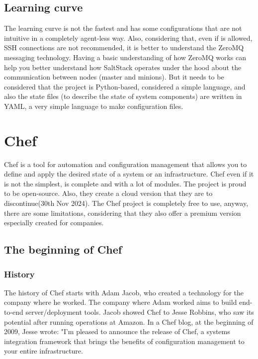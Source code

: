 \documentclass[12pt,a4paper,openright,twoside]{book}
\begin{document}
\section{Learning curve}
The learning curve is not the fastest and has some configurations that are not intuitive in a completely agent-less way.
Also, considering that, even if is allowed, SSH connections are not recommended, it is better to understand the ZeroMQ messaging technology.
Having a basic understanding of how ZeroMQ works can help you better understand how SaltStack operates under the hood about the communication between nodes (master and minions).
But it needs to be considered that the project is Python-based, considered a simple language, and also the state files (to describe the state of system components) are written in YAML, a very simple language to make configuration files.

\chapter{Chef}
Chef is a tool for automation and configuration management that allows you to define and apply the desired state of a system or an infrastructure.
Chef even if it is not the simplest, is complete and with a lot of modules. The project is proud to be open-source.
Also, they create a cloud version that they are to discontinue(30th Nov 2024).
The Chef project is completely free to use, anyway, there are some limitations, considering that they also offer a premium version especially created for companies.

\section{The beginning of Chef}

\subsection{History}
The history of Chef starts with Adam Jacob, who created a technology for the company where he worked.
The company where Adam worked aims to build end-to-end server/deployment tools. Jacob showed Chef to Jesse Robbins, who saw its potential after running operations at Amazon.
In a Chef blog, at the beginning of 2009, Jesse wrote:
"I'm pleased to announce the release of Chef, a systems integration framework that brings the benefits of configuration management to your entire infrastructure.
\end{document}
